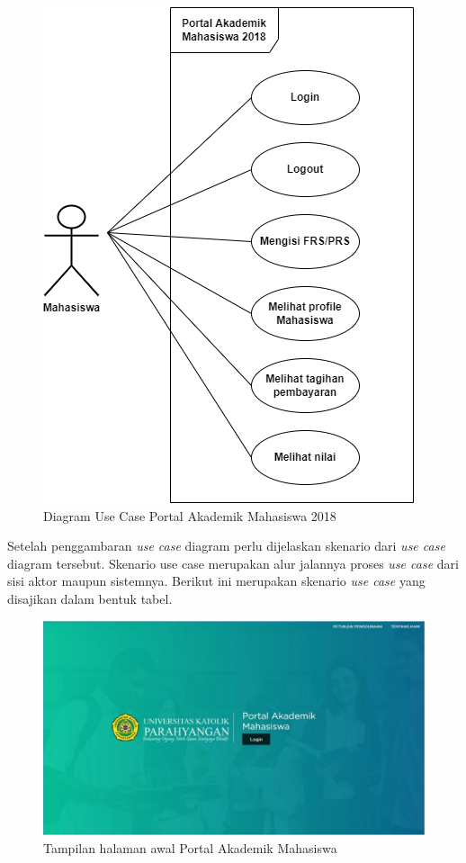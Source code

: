 \begin{figure}[H]
	\centering
	\includegraphics[scale=0.6]{Gambar/usecase.png}
	\caption{Diagram Use Case Portal Akademik Mahasiswa 2018} 
	\label{fig:usecase2018}
\end{figure}
Setelah penggambaran \textit{use case} diagram perlu dijelaskan skenario dari \textit{use case} diagram tersebut. Skenario use case merupakan alur jalannya proses \textit{use case} dari sisi aktor maupun sistemnya. Berikut ini merupakan skenario \textit{use case} yang disajikan dalam bentuk tabel.
 
\begin{figure}[H]
	\centering
	\includegraphics[scale=0.4]{Gambar/halaman2018.jpg}
	\caption{Tampilan halaman awal Portal Akademik Mahasiswa} 
	\label{fig:studpor_home_2018}
\end{figure}

